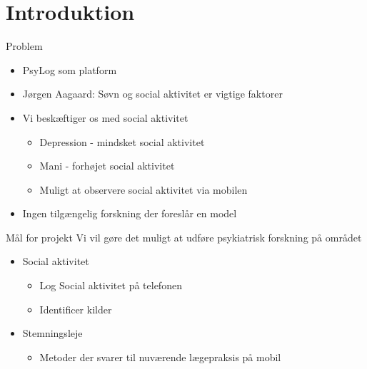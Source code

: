 \section{Introduktion}
{%
	\begin{frame}{Problem} %
\begin{itemize}
	\item PsyLog som platform
	\item Jørgen Aagaard: Søvn og social aktivitet er vigtige faktorer
	\item Vi beskæftiger os med social aktivitet
	\begin{itemize}
		\item Depression - mindsket social aktivitet
		\item Mani - forhøjet social aktivitet
		\item Muligt at observere social aktivitet via mobilen
	\end{itemize}
	\item Ingen tilgængelig forskning der foreslår en model
\end{itemize}

\end{frame}}


{ %
	\begin{frame}{Mål for projekt} %
		Vi vil gøre det muligt at udføre psykiatrisk forskning på området
		\begin{itemize}
			\item Social aktivitet
			\begin{itemize}
				\item Log Social aktivitet på telefonen
				\item Identificer kilder
			\end{itemize}	
			\item Stemningsleje
			\begin{itemize}
				\item Metoder der svarer til nuværende lægepraksis på mobil
			\end{itemize}
		\end{itemize}
	\end{frame}}
	



